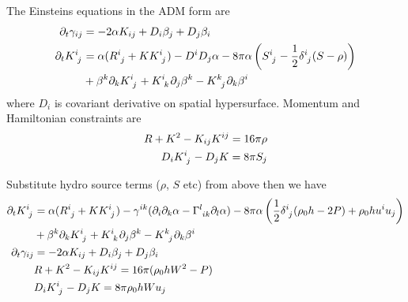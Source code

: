 \documentclass[prd]{revtex4}
\newcommand*\apost{\textsc{\char13}}
\begin{document}
The Einstein\apost s equations in the ADM form are
\begin{align}
\label{eqn:adm:gam}
\partial_t \gamma_{ij} &= - 2 \alpha K_{ij} + D_i \beta_j + D_j \beta_i \\ 
\label{eqn:adm:K}
\partial_t K\indices{^i_j} &= \alpha (R\indices{^i_j} + K K\indices{^i_j}) - D^i D_j \alpha - 8 \pi \alpha \left(S\indices{^i_j} - \frac{1}{2} \delta\indices{^i_j} (S-\rho)\right) \nonumber \\
& + \beta^k \partial_k K\indices{^i_j} + K\indices{^i_k} \partial_j \beta^k - K\indices{^k_j} \partial_k \beta^i
\end{align}
where $D_i$ is covariant derivative on spatial hypersurface. Momentum and Hamiltonian constraints are
\begin{align}
R+K^2 - K_{ij} K^{ij} = 16 \pi \rho \\
D_i K\indices{^i_j} - D_j K = 8 \pi S_j
\end{align}

Substitute hydro source terms ($\rho$, $S$ etc) from above then we have
\begin{align}
\partial_t K\indices{^i_j} &= \alpha (R\indices{^i_j} + K K\indices{^i_j}) - \gamma^{ik} (\partial_i \partial_k \alpha - \Gamma\indices{^l_{ik}} \partial_l \alpha) - 8 \pi \alpha \left(\frac{1}{2} \delta\indices{^i_j} (\rho_0 h - 2 P) + \rho_0 h u^i u_j \right) \nonumber \\
& + \beta^k \partial_k K\indices{^i_j} + K\indices{^i_k} \partial_j \beta^k - K\indices{^k_j} \partial_k \beta^i \\
\partial_t \gamma_{ij} &= - 2 \alpha K_{ij} + D_i \beta_j + D_j \beta_i \\ 
&R+K^2 - K_{ij} K^{ij} = 16 \pi (\rho_0 h W^2 -P)\\
&D_i K\indices{^i_j} - D_j K = 8 \pi \rho_0 h W u_j
\end{align}
\end{document}
